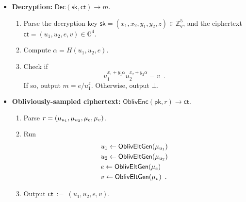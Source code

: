 \documentclass[11pt,letterpaper]{article}
\theoremstyle{plain} %
\theoremstyle{definition} %
\theoremstyle{remark} %
\newcommand{\eqdef}{\ {:=} \ }
\newcommand{\OblivEnc}{\mathsf{OblivEnc}}
\newcommand{\Dec}{\mathsf{Dec}}
\newcommand{\EncKey}{\mathsf{pk}}
\newcommand{\DecKey}{\mathsf{sk}}
\newcommand{\Msg}{m}
\newcommand{\Ct}{\mathsf{ct}}
\newcommand{\Rand}{r}
\newcommand{\Integers}{\mathbb{Z}}
\newcommand{\Group}{\mathbb{G}}
\newcommand{\GrpOrd}{q}
\newcommand{\GrpEltE}{e}
\newcommand{\GrpEltU}{u}
\newcommand{\GrpEltV}{v}
\newcommand{\Hash}{H}
\newcommand{\ExpX}{x}
\newcommand{\ExpY}{y}
\newcommand{\ExpZ}{z}
\newcommand{\Tag}{\alpha}
\begin{document}
\begin{itemize}[nolistsep]
    \item \textbf{Decryption:} $\Dec(\DecKey, \Ct) \to \Msg$.
    \begin{enumerate}[nolistsep]
        \item Parse the decryption key $\DecKey = (\ExpX_1, \ExpX_2, \ExpY_1, \ExpY_2, \ExpZ) \in \Integers_{\GrpOrd}^5$, and the ciphertext $\Ct = (\GrpEltU_1, \GrpEltU_2, \GrpEltE, \GrpEltV) \in \Group^4$.
        \item Compute $\Tag = \Hash(\GrpEltU_1, \GrpEltU_2, \GrpEltE)$.
        \item Check if
        \begin{equation*}
            \GrpEltU_1^{\ExpX_1 + \ExpY_1 \Tag} \GrpEltU_2^{\ExpX_2 + \ExpY_2 \Tag} = \GrpEltV
            \enspace.
        \end{equation*} If so, output $\Msg = \GrpEltE / \GrpEltU_1^{\ExpZ}$. Otherwise, output $\bot$.
    \end{enumerate}

    \item \textbf{Obliviously-sampled ciphertext:} $\OblivEnc(\EncKey, \Rand) \to \Ct$.
    \begin{enumerate}[nolistsep]
        \item Parse $\Rand = (\RandStr_{\GrpEltU_1}, \RandStr_{\GrpEltU_2}, \RandStr_{\GrpEltE}, \RandStr_{\GrpEltV})$.
        \item Run
        \begin{align*}
            &\GrpEltU_1 \gets \OblivEltGen( \RandStr_{\GrpEltU_1})\\
            &\GrpEltU_2 \gets \OblivEltGen( \RandStr_{\GrpEltU_2})\\
            &\GrpEltE \gets \OblivEltGen( \RandStr_{\GrpEltE})\\
            &\GrpEltV \gets \OblivEltGen( \RandStr_{\GrpEltV})
            \enspace.
        \end{align*}
        \item Output $\Ct \eqdef (\GrpEltU_1,\GrpEltU_2,\GrpEltE,\GrpEltV)$.
    \end{enumerate}


\end{itemize}
\end{document}
